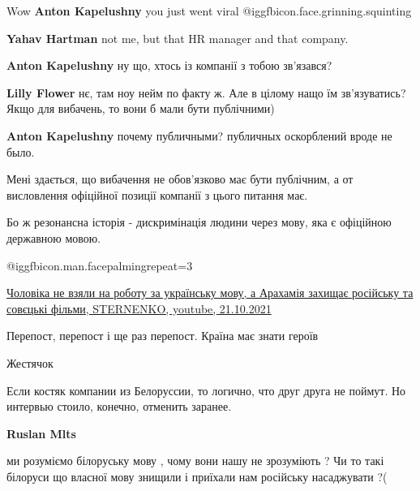 \begin{itemize}
Wow \textbf{Anton Kapelushny} you just went viral  @igg{fbicon.face.grinning.squinting} 

\begin{itemize} %
\textbf{Yahav Hartman} not me, but that HR manager and that company.
\end{itemize} %

\textbf{Anton Kapelushny} ну що, хтось із компанії з тобою зв’язався?

\begin{itemize} %
\textbf{Lilly Flower} нє, там ноу нейм по факту ж. Але в цілому нащо їм зв'язуватись? Якщо для вибачень, то вони б мали бути публічними)

\textbf{Anton Kapelushny} почему публичными? публичных оскорблений вроде не было.


Мені здається, що вибачення не обов’язково має бути публічним, а от висловлення
офіційної позиції компанії з цього питання має.

Бо ж резонансна історія - дискримінація людини через мову, яка є офіційною
державною мовою.

\end{itemize} %

 @igg{fbicon.man.facepalming}{repeat=3} 


\href{https://www.youtube.com/watch?v=oMVJDlzMfUw}{%
Чоловіка не взяли на роботу за українську мову, а Арахамія захищає російську та совєцькі фільми, %
STERNENKO, youtube, 21.10.2021%
}

Перепост, перепост і ще раз перепост. Країна має знати героїв

Жестячок


Если костяк компании из Белоруссии, то логично, что друг друга не поймут. Но
интервью стоило, конечно, отменить заранее.

\begin{itemize} %
\textbf{Ruslan Mlts} 

ми розуміємо білоруську мову , чому вони нашу не зрозуміють ? Чи то такі
білоруси що власної мову знищили і приїхали нам російську насаджувати ?(



\end{itemize}
\end{itemize}
